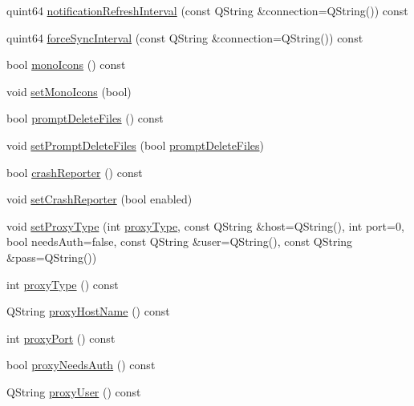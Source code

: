 \begin{DoxyCompactItemize}
\item 
quint64 \hyperlink{class_o_c_c_1_1_config_file_a04836d83e2f6a8a752f2a0e5e23c140f}{notification\+Refresh\+Interval} (const Q\+String \&connection=Q\+String()) const
\item 
quint64 \hyperlink{class_o_c_c_1_1_config_file_a7e4c8fcfe936a291b78fb411dd08075c}{force\+Sync\+Interval} (const Q\+String \&connection=Q\+String()) const
\item 
bool \hyperlink{class_o_c_c_1_1_config_file_a512878a73347e2a9dab8ede1794017d7}{mono\+Icons} () const
\item 
void \hyperlink{class_o_c_c_1_1_config_file_acd50d4c2adddf82d31f00f93377737fd}{set\+Mono\+Icons} (bool)
\item 
bool \hyperlink{class_o_c_c_1_1_config_file_ae5c533f08ad48250a0b41f368c95e2bb}{prompt\+Delete\+Files} () const
\item 
void \hyperlink{class_o_c_c_1_1_config_file_a51cd58394a5b0c134ba2e1eaa00bd991}{set\+Prompt\+Delete\+Files} (bool \hyperlink{class_o_c_c_1_1_config_file_ae5c533f08ad48250a0b41f368c95e2bb}{prompt\+Delete\+Files})
\item 
bool \hyperlink{class_o_c_c_1_1_config_file_ab3d85f4bc38a77e8b48efd08040fc1c3}{crash\+Reporter} () const
\item 
void \hyperlink{class_o_c_c_1_1_config_file_ad90a0e5ab03758bcc9a3ca2eda09c993}{set\+Crash\+Reporter} (bool enabled)
\item 
void \hyperlink{class_o_c_c_1_1_config_file_a19b06f02130802695ebf578f343dbf9a}{set\+Proxy\+Type} (int \hyperlink{class_o_c_c_1_1_config_file_af866cb0cd9f304dac04af1c7885f9b0e}{proxy\+Type}, const Q\+String \&host=Q\+String(), int port=0, bool needs\+Auth=false, const Q\+String \&user=Q\+String(), const Q\+String \&pass=Q\+String())
\item 
int \hyperlink{class_o_c_c_1_1_config_file_af866cb0cd9f304dac04af1c7885f9b0e}{proxy\+Type} () const
\item 
Q\+String \hyperlink{class_o_c_c_1_1_config_file_a0e6b727423c449608755549c560806ca}{proxy\+Host\+Name} () const
\item 
int \hyperlink{class_o_c_c_1_1_config_file_a26b2547432bb6c4753509dd52ce96c3d}{proxy\+Port} () const
\item 
bool \hyperlink{class_o_c_c_1_1_config_file_a462999b0a8fee20678d87575b1962489}{proxy\+Needs\+Auth} () const
\item 
Q\+String \hyperlink{class_o_c_c_1_1_config_file_a7a99c01b20e0af9bbc878541c4edc41b}{proxy\+User} () const
\item 

\end{DoxyCompactItemize}
